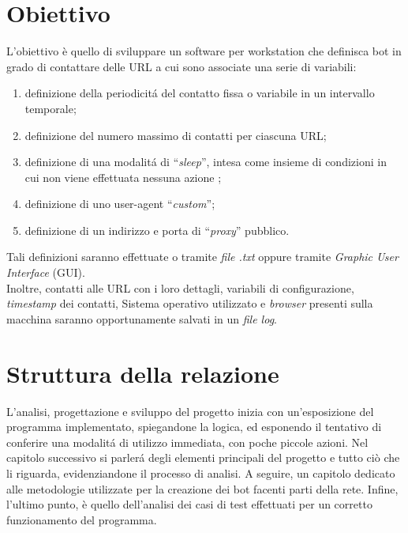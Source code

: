 \section{Obiettivo}
L'obiettivo \`e quello di sviluppare un software per workstation che definisca bot in grado di contattare delle URL a cui sono associate una serie di variabili:
\begin{enumerate}
\item definizione della periodicit\'a del contatto fissa o variabile in un intervallo temporale;
\item definizione del numero massimo di contatti per ciascuna URL;
\item definizione di una modalit\'a di ``\textit{sleep}'', intesa come insieme di condizioni in cui non viene effettuata nessuna azione ;
\item definizione di uno user-agent ``\textit{custom}'';
\item definizione di un indirizzo e porta di ``\textit{proxy}'' pubblico.
\end{enumerate}
Tali definizioni saranno effettuate o tramite \textit{file .txt} oppure tramite \textit{Graphic User Interface} (GUI).\\
Inoltre, contatti alle URL con i loro dettagli, variabili di configurazione, \textit{timestamp} dei contatti, Sistema operativo utilizzato e \textit{browser} presenti sulla macchina
saranno opportunamente salvati in un \textit{file log}.

\vspace*{1cm}
\section{Struttura della relazione}
L'analisi, progettazione e sviluppo del progetto inizia con un'esposizione del programma implementato, spiegandone la logica, ed esponendo il tentativo di conferire una modalit\'a di utilizzo immediata, con poche piccole azioni. Nel capitolo successivo si parler\'a degli elementi principali del progetto e tutto ci\`o che li riguarda, evidenziandone il processo di analisi. A seguire, un capitolo dedicato alle metodologie utilizzate per la creazione dei bot facenti parti della rete. Infine, l'ultimo punto, \`e quello dell'analisi dei casi di test effettuati per un corretto funzionamento del programma.